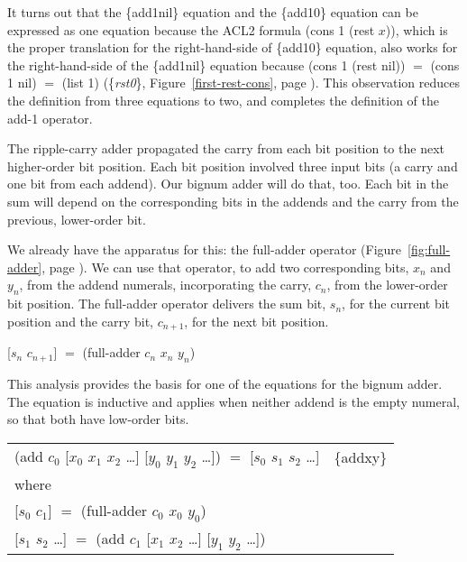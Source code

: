 It turns out that the \{add1nil\} equation
and the \{add10\} equation can be expressed as one equation because
the ACL2 formula \textsf{(cons 1 (rest $x$))}, which is the proper
translation for the right-hand-side of \{add10\} equation,
also works for the right-hand-side of the \{add1nil\} equation
because \textsf{(cons 1 (rest nil))} $=$ \textsf{(cons 1 nil)} $=$ \textsf{(list 1)}
(\{\emph{rst0}\}, Figure~\ref{first-rest-cons}, page \pageref{first-rest-cons}).
This observation reduces the definition from three equations to two,
and completes the definition of the \textsf{add-1} operator.

The ripple-carry adder propagated the carry from each bit position
to the next higher-order bit position.
Each bit position involved three input bits
(a carry and one bit from each addend).
Our bignum adder will do that, too.
Each bit in the sum will depend on the
corresponding bits in the addends and the carry from
the previous, lower-order bit.

We already have the apparatus for this: the \textsf{full-adder} operator
(Figure~\ref{fig:full-adder},  page \pageref{fig:full-adder}).
We can use that operator, to add two corresponding bits,
$x_n$ and $y_n$, from the addend numerals,
incorporating the carry, $c_n$, from the lower-order bit position.
The \textsf{full-adder} operator delivers the sum bit, $s_n$, for the current
bit position and the carry bit, $c_{n+1}$, for the next bit position.
\begin{center}
\textsf{[$s_n$ $c_{n+1}$]} $=$ \textsf{(full-adder $c_n$ $x_n$ $y_n$)}
\end{center}

This analysis provides the basis for
one of the equations for the bignum adder.
The equation is inductive and applies
when neither addend is the empty numeral,
so that both have low-order bits.

\begin{center}
\begin{tabular}{ll}
\textsf{(add $c_0$ [$x_0$ $x_1$ $x_2$ \dots ] [$y_0$ $y_1$ $y_2$ \dots ])} $=$ \textsf{[$s_0$ $s_1$ $s_2$ \dots ]}   & \{addxy\} \\
where & \\
\textsf{[$s_0$ $c_1$]} $=$ \textsf{(full-adder $c_0$ $x_0$ $y_0$)} & \\
\textsf{[$s_1$ $s_2$ \dots ]} $=$ \textsf{(add $c_1$ [$x_1$ $x_2$ \dots ] [$y_1$ $y_2$ \dots ])} & \\
\end{tabular}
\end{center}

